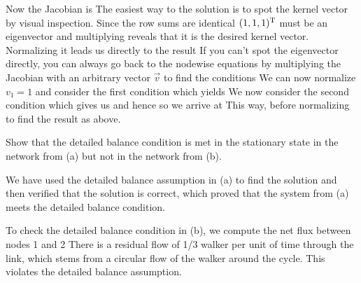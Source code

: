 \solution
Now the Jacobian is 
The easiest way to the solution is to spot the kernel vector by visual inspection. Since the row sums are identical $(1,1,1)^{\rm T}$ must be an eigenvector and multiplying 
reveals that it is the desired kernel vector. Normalizing it leads us directly to the result 
If you can't spot the eigenvector directly, you can always go back to the nodewise equations by multiplying the Jacobian with an arbitrary vector $\vec{v}$ to find the conditions
We can now normalize $v_1=1$ and consider the first condition 
which yields 
We now consider the second condition 
which gives us 
and hence 
so we arrive at
This way, before normalizing to find the result 
as above. 

\subquestion
Show that the detailed balance condition is met in the stationary state in the network from (a) but not in the network from (b).

\solution 
We have used the detailed balance assumption in (a) to find the solution and then verified that the solution is correct, which proved that the system from (a) meets the detailed balance condition. 

To check the detailed balance condition in (b), we compute the net flux between nodes 1 and 2 
There is a residual flow of 1/3 walker per unit of time through the link, which stems from a circular flow of the walker around the cycle. This violates the detailed balance assumption.